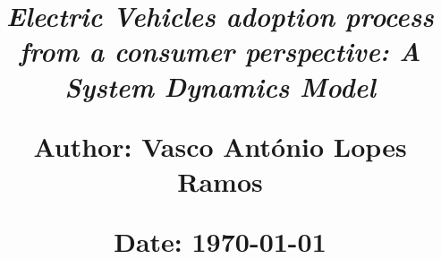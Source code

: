 \documentclass{article}
\begin{document}
\renewcommand{\abstractname}{\begin{flushleft}\large \lowercase{INTRODUCTORY} N\lowercase{OTE}:\end{flushleft}}

\title{\vspace{-0.9cm}
       \large\raggedright\textbf{\emph{Electric Vehicles adoption process from a consumer perspective: A System Dynamics Model}} \\ 
       \vspace{1cm}
       \normalsize
       \raggedright\textbf{Author: \hspace{1.1cm} Vasco António Lopes Ramos} \\ \vspace{0.4cm}
       \raggedright\textbf{Date: \hspace{1.45cm} \today} \\}
\author{}
\date{}


\maketitle
\thispagestyle{fancy}

\vspace{-1.4cm}

\tableofcontents

\newpage

\fontsize{10pt}{13pt}
\selectfont
\lsstyle

















\end{document}
